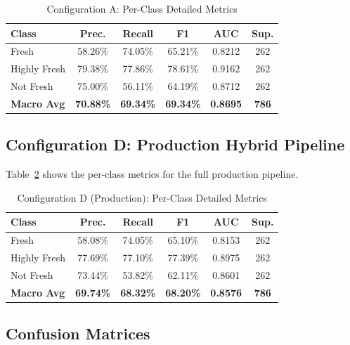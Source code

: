 \documentclass[conference]{IEEEtran}
\begin{document}
\begin{table}[h]
\centering
\caption{Configuration A: Per-Class Detailed Metrics}
\label{tab:config_a_detail}
\begin{tabular}{lccccc}
\toprule
\textbf{Class} & \textbf{Prec.} & \textbf{Recall} & \textbf{F1} & \textbf{AUC} & \textbf{Sup.} \\
\midrule
Fresh & 58.26\% & 74.05\% & 65.21\% & 0.8212 & 262 \\
Highly Fresh & 79.38\% & 77.86\% & 78.61\% & 0.9162 & 262 \\
Not Fresh & 75.00\% & 56.11\% & 64.19\% & 0.8712 & 262 \\
\midrule
\textbf{Macro Avg} & \textbf{70.88\%} & \textbf{69.34\%} & \textbf{69.34\%} & \textbf{0.8695} & \textbf{786} \\
\bottomrule
\end{tabular}
\end{table}

\subsection{Configuration D: Production Hybrid Pipeline}

Table~\ref{tab:config_d_detail} shows the per-class metrics for the full production pipeline.

\begin{table}[h]
\centering
\caption{Configuration D (Production): Per-Class Detailed Metrics}
\label{tab:config_d_detail}
\begin{tabular}{lccccc}
\toprule
\textbf{Class} & \textbf{Prec.} & \textbf{Recall} & \textbf{F1} & \textbf{AUC} & \textbf{Sup.} \\
\midrule
Fresh & 58.08\% & 74.05\% & 65.10\% & 0.8153 & 262 \\
Highly Fresh & 77.69\% & 77.10\% & 77.39\% & 0.8975 & 262 \\
Not Fresh & 73.44\% & 53.82\% & 62.11\% & 0.8601 & 262 \\
\midrule
\textbf{Macro Avg} & \textbf{69.74\%} & \textbf{68.32\%} & \textbf{68.20\%} & \textbf{0.8576} & \textbf{786} \\
\bottomrule
\end{tabular}
\end{table}

\subsection{Confusion Matrices}
\end{document}
